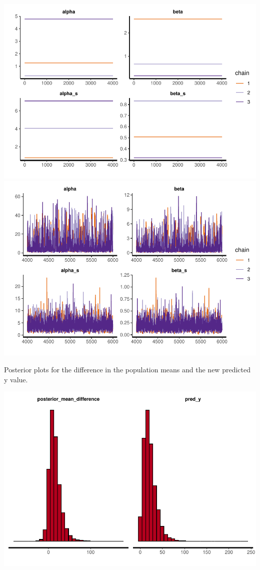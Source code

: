 \documentclass[
]{article}
\begin{document}
\includegraphics{hw2_files/figure-latex/unnamed-chunk-4-1.pdf}
\includegraphics{hw2_files/figure-latex/unnamed-chunk-4-2.pdf}

Posterior plots for the difference in the population means and the new
predicted y value.

\includegraphics{hw2_files/figure-latex/unnamed-chunk-5-1.pdf}
\end{document}
